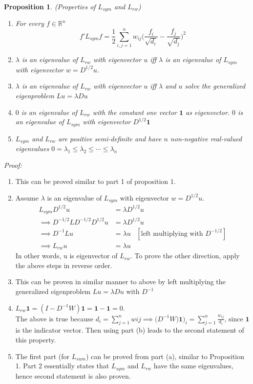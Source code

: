 \documentclass[10pt,a4paper, nocenter]{report}
\newtheorem{prop}{Proposition}
\begin{document}
    \begin{prop}
        (Properties of $L_{sym}$ and $L_{rw}$)
        \begin{enumerate}
            \item
            For every $f\in\mathbb{R}^{n}$
            $$ f'L_{sym}f = \frac{1}{2}\sum_{i,j=1}^{n}w_{ij}\bigg(\frac{f_{i}}{\sqrt{d_{i}}}-\frac{f_{j}}{\sqrt{d_{j}}}\bigg)^{2} $$
            \item $\lambda$ is an eigenvalue of $L_{rw}$ with eigenvector $u$ iff $\lambda$ is an eigenvalue of $L_{sym}$ with eigenvector $w=D^{1/2}u$.
            \item $\lambda$ is an eigenvalue of $L_{rw}$ with eigenvector $u$ iff $\lambda$ and $u$ solve the generalized eigenproblem $Lu=\lambda Du$
            \item $0$ is an eigenvalue of $L_{rw}$ with the constant one vector $\mathbf{1}$ as eigenvector. $0$ is an eigenvalue of $L_{sym}$ with eigenvector $D^{1/2}\mathbf{1}$
            \item $L_{sym}$ and $L_{rw}$ are positive semi-definite and have $n$ non-negative real-valued eigenvalues $0=\lambda_{1} \le \lambda_{2} \le \cdots \le \lambda_{n}$
        \end{enumerate}
    \end{prop}
    \textit{Proof:}
    \begin{enumerate}
        \item This can be proved similar to part 1 of proposition 1. 
        \item Assume $\lambda$ is an eigenvalue of $L_{sym}$ with eigenvector $w=D^{1/2}u$. 
        \begin{align*}
        L_{sym}D^{1/2}u &= \lambda D^{1/2}u \\
        \implies  D^{-1/2}LD^{-1/2}D^{1/2}u &= \lambda D^{1/2}u \\
        \implies D^{-1}Lu &= \lambda u \hspace{10pt}[\text{left multiplying with } D^{-1/2}] \\
        \implies L_{rw}u &= \lambda u
        \end{align*}
        In other words, u is eigenvector of $L_{rw}$. To prove the other direction, apply the above steps in reverse order.
        \item This can be proven in similar manner to above by left multiplying the generalized eigenproblem $Lu = \lambda Du$ with $D^{-1}$
        \item $L_{rw}\mathbf{1} = (I-D^{-1}W)\mathbf{1} = \mathbf{1}-\mathbf{1} = 0$.\\ The above is true because $d_{i} = \sum_{j=1}^{n}wij \implies \big(D^{-1}W)\mathbf{1}\big)_{i} = \sum_{j=1}^{n}\frac{w_{ij}}{d_{i}}$, since $\mathbf{1}$ is the indicator vector. Then using part (b) leads to the second statement of this property. 
        \item The first part (for $L_{sum}$) can be proved from part (a), similar to Proposition 1. Part 2 essentially states that $L_{sym}$ and $L_{rw}$ have the same eigenvalues, hence second statement is also proven.
    \end{enumerate}					
\end{document}

